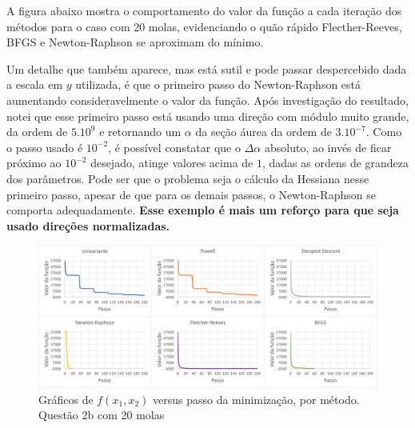 \documentclass[10pt, a4paper]{article}
\begin{document}
A figura abaixo mostra o comportamento do valor da função a cada iteração dos métodos para o caso
com 20 molas, evidenciando o quão rápido Flecther-Reeves,
BFGS e Newton-Raphson se aproximam do mínimo.  

Um detalhe que também aparece, mas está sutil e pode passar despercebido dada a escala em $y$ utilizada,
é que o primeiro passo do Newton-Raphson está aumentando consideravelmente o valor da função. Após investigação do resultado,
notei que esse primeiro passo está usando uma direção com módulo muito grande, da ordem de $5.10^9$ e retornando um 
$\alpha$ da seção áurea da ordem de $3.10^{-7}$. Como o passo usado é $10^{-2}$, é possível constatar que o $\Delta \alpha$
absoluto, ao invés de ficar próximo ao ${10^{-2}}$ desejado, atinge valores acima de $1$, dadas as ordens de grandeza dos
parâmetros. Pode ser que o problema seja o cálculo da Hessiana nesse primeiro passo, apesar de que para os demais passos,
o Newton-Raphson se comporta adequadamente. \textbf{Esse exemplo é mais um reforço para que seja usado direções normalizadas.}

\begin{figure}[H]
  \centering
  \includegraphics[scale=0.45]{figuras/q2b_fxpassos_20molas.PNG}
  \caption{Gráficos de $f(x_1,x_2)$ versus passo da minimização, por método. Questão 2b com 20 molas}
\end{figure}
\end{document}
